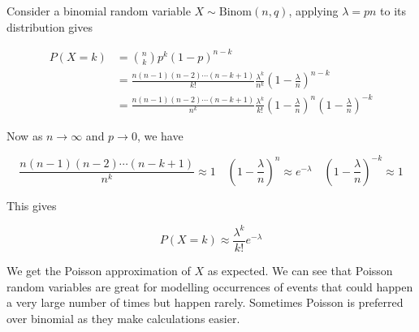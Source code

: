 \documentclass[12pt, a4paper]{article}
\begin{document}
Consider a binomial random variable $X\sim\text{Binom}(n,q)$, applying $\lambda=pn$ to its distribution gives

\begin{align}
P(X = k) &= {n \choose k}p^k(1-p)^{n-k} \\
&=\frac{n(n-1)(n-2)\cdots(n-k+1)}{k!}\frac{\lambda^k}{n^k}\left(1-\frac{\lambda}{n}\right)^{n-k} \\
&=\frac{n(n-1)(n-2)\cdots(n-k+1)}{n^k}\frac{\lambda^k}{k!}\left(1-\frac{\lambda}{n}\right)^n\left(1-\frac{\lambda}{n}\right)^{-k}
\end{align}

Now as $n \to \infty$ and $p \to 0$, we have

$$\frac{n(n-1)(n-2)\cdots(n-k+1)}{n^k} \approx 1 \quad \left(1-\frac{\lambda}{n}\right)^n \approx e^{-\lambda} \quad \left(1-\frac{\lambda}{n}\right)^{-k} \approx 1$$

This gives

$$P(X = k) \approx \frac{\lambda^k}{k!}e^{-\lambda}$$

We get the Poisson approximation of $X$ as expected. We can see that Poisson random variables are great for modelling occurrences of events that could happen a very large number of times but happen rarely. Sometimes Poisson is preferred over binomial as they make calculations easier.
\end{document}
